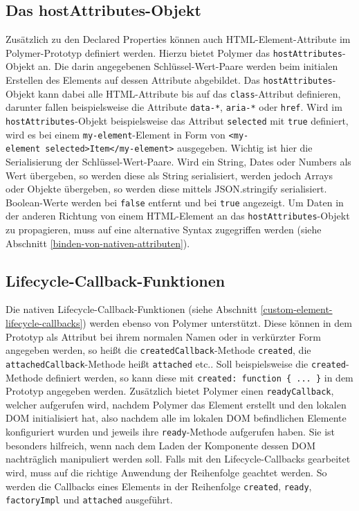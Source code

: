 \subsection{Das hostAttributes-Objekt}\label{das-hostattributes-objekt}

Zusätzlich zu den Declared Properties können auch \ac{HTML}-Element-Attribute im Polymer-Prototyp definiert werden. Hierzu bietet Polymer das \texttt{hostAttributes}-Objekt an. Die darin angegebenen Schlüssel-Wert-Paare werden beim initialen Erstellen des Elements auf dessen Attribute abgebildet. Das \texttt{hostAttributes}-Objekt kann dabei alle \ac{HTML}-Attribute bis auf das \texttt{class}-Attribut definieren, darunter fallen beispielsweise die Attribute \texttt{data-*}, \texttt{aria-*} oder \texttt{href}. Wird im \texttt{hostAttributes}-Objekt beispielsweise das Attribut \texttt{selected} mit \texttt{true} definiert, wird es bei einem \texttt{my-element}-Element in Form von \texttt{\textless{}my-element\ selected\textgreater{}Item\textless{}/my-element\textgreater{}} ausgegeben. Wichtig ist hier die Serialisierung der Schlüssel-Wert-Paare. Wird ein String, Dates oder Numbers als Wert übergeben, so werden diese als String serialisiert, werden jedoch Arrays oder Objekte übergeben, so werden diese mittels JSON.stringify serialisiert. Boolean-Werte werden bei \texttt{false} entfernt und bei \texttt{true} angezeigt. Um Daten in der anderen Richtung von einem \ac{HTML}-Element an das \texttt{hostAttributes}-Objekt zu propagieren, muss auf eine alternative Syntax zugegriffen werden (siehe Abschnitt \ref{binden-von-nativen-attributen}).


\subsection{Lifecycle-Callback-Funktionen}\label{lifecycle-callback-funktionen}

Die nativen Lifecycle-Callback-Funktionen (siehe Abschnitt \ref{custom-element-lifecycle-callbacks}) werden ebenso von Polymer unterstützt. Diese können in dem Prototyp als Attribut bei ihrem normalen Namen oder in verkürzter Form angegeben werden, so heißt die \texttt{createdCallback}-Methode \texttt{created}, die \texttt{attachedCallback}-Methode heißt \texttt{attached} etc.. Soll beispielsweise die \texttt{created}-Methode definiert werden, so kann diese mit \texttt{created:\ function\ \{\ ...\ \}} in dem Prototyp angegeben werden. Zusätzlich bietet Polymer einen \texttt{readyCallback}, welcher aufgerufen wird, nachdem Polymer das Element erstellt und den lokalen \ac{DOM} initialisiert hat, also nachdem alle im lokalen \ac{DOM} befindlichen Elemente konfiguriert wurden und jeweils ihre \texttt{ready}-Methode aufgerufen haben. Sie ist besonders hilfreich, wenn nach dem Laden der Komponente dessen \ac{DOM} nachträglich manipuliert werden soll. Falls mit den Lifecycle-Callbacks gearbeitet wird, muss auf die richtige Anwendung der Reihenfolge geachtet werden. So werden die Callbacks eines Elements in der Reihenfolge \texttt{created}, \texttt{ready}, \texttt{factoryImpl} und \texttt{attached} ausgeführt.


